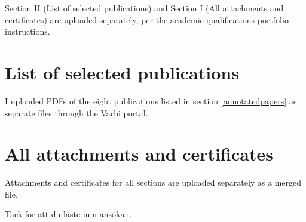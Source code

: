 


\maketitle

\tableofcontents

\vspace{1cm}
\noindent Section H (List of selected publications) and Section I (All attachments and certificates) are uploaded separately, per the academic qualifications portfolio instructions.



{
	\renewcommand\thesection{\roman{section}}
	\setlength\parindent{0pt}
	
}



{
	\setlength\parindent{0pt}
  
}











\vspace{2cm}

\section{List of selected publications} \label{sec:list-of-selected-publications}
I uploaded PDFs of the eight publications listed in section \ref{annotatedpapers} as separate files through the Varbi portal.

\section{All attachments and certificates} \label{sec:all-attachments-and-certificates}
Attachments and certificates for all sections are uploaded separately as a merged file.

\vspace{0.5cm}
\noindent Tack f\"or att du l\"aste min ans\"okan.


